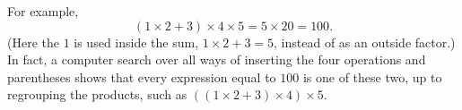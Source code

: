 For example,
\[\boxed{(1\times2+3)\times4\times5}=5\times20=100.\]
(Here the $1$ is used inside the sum, $1\times2+3=5$, instead of as an outside factor.) In fact, a computer search over all ways of inserting the four operations and parentheses shows that every expression equal to $100$ is one of these two, up to regrouping the products, such as $\left((1\times2+3)\times4\right)\times5$.
